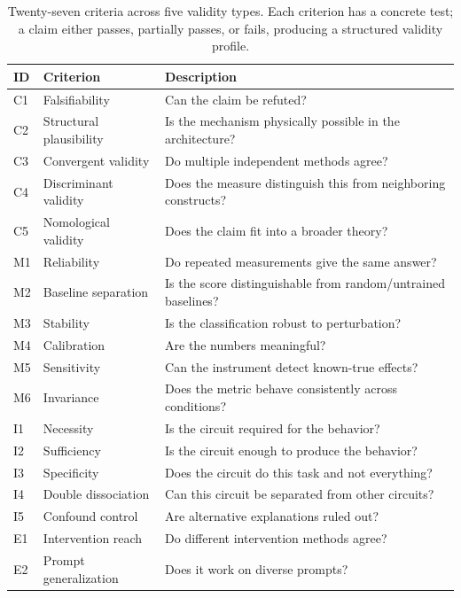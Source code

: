 \documentclass[10pt]{article}
\begin{document}
\begingroup
{}
\begin{table}[H]
\centering
\small
\caption{Twenty-seven criteria across five validity types. Each criterion has a concrete test; a claim either passes, partially passes, or fails, producing a structured validity profile.}
\label{tab:criteria}
\renewcommand{\arraystretch}{1.15}
\begin{tabular}{@{}llp{8.5cm}@{}}
\toprule
\textbf{ID} & \textbf{Criterion} & \textbf{Description} \\
\midrule
C1 & Falsifiability & Can the claim be refuted? \\
C2 & Structural plausibility & Is the mechanism physically possible in the architecture? \\
C3 & Convergent validity & Do multiple independent methods agree? \\
C4 & Discriminant validity & Does the measure distinguish this from neighboring constructs? \\
C5 & Nomological validity & Does the claim fit into a broader theory? \\
\midrule
M1 & Reliability & Do repeated measurements give the same answer? \\
M2 & Baseline separation & Is the score distinguishable from random/untrained baselines? \\
M3 & Stability & Is the classification robust to perturbation? \\
M4 & Calibration & Are the numbers meaningful? \\
M5 & Sensitivity & Can the instrument detect known-true effects? \\
M6 & Invariance & Does the metric behave consistently across conditions? \\
\midrule
I1 & Necessity & Is the circuit required for the behavior? \\
I2 & Sufficiency & Is the circuit enough to produce the behavior? \\
I3 & Specificity & Does the circuit do this task and not everything? \\
I4 & Double dissociation & Can this circuit be separated from other circuits? \\
I5 & Confound control & Are alternative explanations ruled out? \\
\midrule
E1 & Intervention reach & Do different intervention methods agree? \\
E2 & Prompt generalization & Does it work on diverse prompts? \\

\end{tabular}
\end{table}
\end{document}
